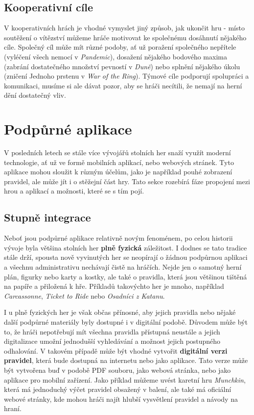 \subsection{Kooperativní cíle}
\label{subsec:cooperative_goals}

V kooperativních hrách je vhodné vymyslet jiný způsob, jak ukončit hru - místo soutěžení o vítězství můžeme hráče motivovat ke společnému dosáhnutí nějakého cíle. Společný cíl může mít různé podoby, ať už poražení společného nepřítele (vyléčení všech nemocí v \textit{Pandemic}), dosažení nějakého bodového maxima (zabrání dostatečného množství pevností v \textit{Duně}) nebo splnění nějakého úkolu (zničení Jednoho prstenu v \textit{War of the Ring}). Týmové cíle podporují spolupráci a komunikaci, musíme si ale dávat pozor, aby se hráči necítili, že nemají na herní dění dostatečný vliv.


\section{Podpůrné aplikace}
\label{sec:app}

V posledních letech se stále více vývojářů stolních her snaží využít moderní technologie, ať už ve formě mobilních aplikací, nebo webových stránek. Tyto aplikace mohou sloužit k různým účelům, jako je například pouhé zobrazení pravidel, ale může jít i o stěžejní část hry. Tato sekce rozebírá fáze propojení mezi hrou a aplikací a možnosti, které se s tím pojí. \cite{corvus_belli_2023}

\subsection{Stupně integrace}
\label{subsec:app_integration}

Neboť jsou podpůrné aplikace relativně novým fenoménem, po celou historii vývoje byla většina stolních her \textbf{plně fyzická} záležitost. I dodnes se tato tradice stále drží, spousta nově vyvinutých her se neopírají o žádnou podpůrnou aplikaci a všechnu administrativu nechávají čistě na hráčích. Nejde jen o samotný herní plán, figurky nebo karty a kostky, ale také o pravidla, která jsou většinou tištěná na papíře a přiložená k hře. Příkladů takovýchto her je mnoho, například \textit{Carcassonne}, \textit{Ticket to Ride} nebo \textit{Osadníci z Katanu}.

I u plně fyzických her je však občas přínosné, aby jejich pravidla nebo nějaké další podpůrné materiály byly dostupné i v digitální podobě. Důvodem může být to, že hráči nepotřebují mít všechna pravidla přístupná neustále a jejich digitalizace umožní jednodušší vyhledávání a možnost jejich postupného odhalování. V takovém případě může být vhodné vytvořit \textbf{digitální verzi pravidel}, která bude dostupná na internetu nebo jako aplikace. Tato verze může být vytvořena buď v podobě PDF souboru, jako webová stránka, nebo jako aplikace pro mobilní zařízení. Jako příklad můžeme uvést karetní hru \textit{Munchkin}, která má jednoduchý výčet pravidel obsažený v balení, ale také má oficiální webové stránky, kde mohou hráči najít hlubší vysvětlení pravidel a návody na hraní.

